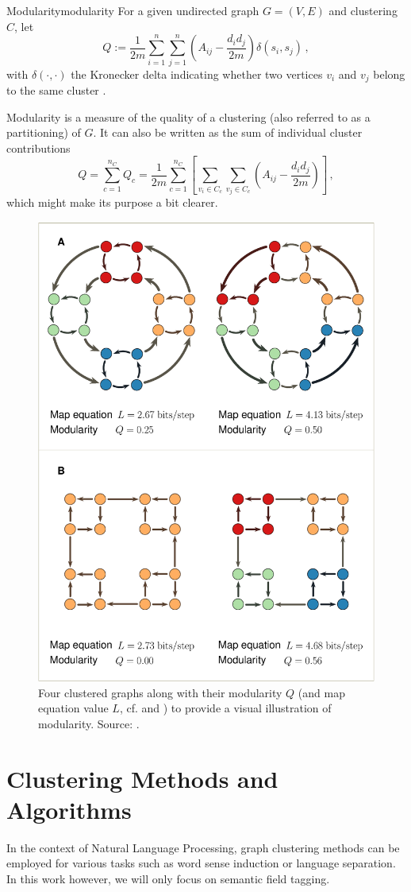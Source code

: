 \documentclass{prettytex/ox/mmsc-special-topic}
\begin{document}
  \begin{definition}{Modularity}{modularity}
    For a given undirected graph $G = (V, E)$ and clustering $C$, let $$Q := \frac{1}{2m} \sum_{i=1}^{n} \sum_{j=1}^{n} \left(A_{ij} - \frac{d_i d_j}{2m}\right) \delta(s_i, s_j)\,,$$ with $\delta(\cdot, \cdot)$ the Kronecker delta indicating whether two vertices $v_i$ and $v_j$ belong to the same cluster \parencite{lambiotte-louvain-clustering}.
  \end{definition}

  Modularity is a measure of the quality of a clustering (also referred to as a partitioning) of $G$. It can also be written as the sum of individual cluster contributions
  $$Q = \sum_{c=1}^{n_C} Q_c = \frac{1}{2m} \sum_{c=1}^{n_C} \left[\sum_{v_i \in C_c} \sum_{v_j \in C_c} \left(A_{ij} - \frac{d_i d_j}{2m}\right)\right]\,,$$
  which might make its purpose a bit clearer.

  \begin{figure}[H]
    \centering
    \includegraphics[width=0.56\linewidth]{figures/nice-modularity.eps}
    \caption{Four clustered graphs along with their modularity $Q$ (and map equation value $L$, cf. \cite{mapequation} and ) to provide a visual illustration of modularity. Source: \cite{mapequation}.}
  \end{figure}

  \section{Clustering Methods and Algorithms}
  In the context of Natural Language Processing, graph clustering methods can be employed for various tasks such as word sense induction or language separation.
  In this work however, we will only focus on semantic field tagging.
\end{document}
